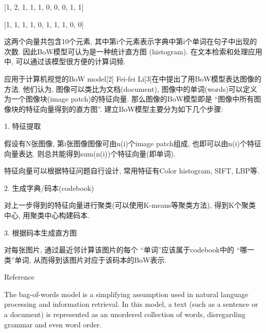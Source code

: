 \documentclass[10pt,a4paper]{ctexbook}
\begin{document}
       

         [1, 2, 1, 1, 1, 0, 0, 0, 1, 1]

           [1, 1, 1, 1, 0, 1, 1, 1, 0, 0]
            

            这两个向量共包含10个元素, 其中第i个元素表示字典中第i个单词在句子中出现的次数. 因此BoW模型可认为是一种统计直方图 (histogram). 在文本检索和处理应用中, 可以通过该模型很方便的计算词频.

            应用于计算机视觉的BoW model[2]
            Fei-fei Li[3]在中提出了用BoW模型表达图像的方法. 他们认为, 图像可以类比为文档(document), 图像中的单词(words)可以定义为一个图像块(image patch)的特征向量. 那么图像的BoW模型即是 “图像中所有图像块的特征向量得到的直方图”. 建立BoW模型主要分为如下几个步骤:

            1. 特征提取

            假设有N张图像, 第i张图像图像可由n(i)个image patch组成, 也即可以由n(i)个特征向量表达. 则总共能得到sum(n(i))个特征向量(即单词).

            特征向量可以根据特征问题自行设计, 常用特征有Color histogram, SIFT, LBP等.

            2. 生成字典/码本(codebook)

            对上一步得到的特征向量进行聚类(可以使用K-means等聚类方法), 得到K个聚类中心, 用聚类中心构建码本.

            3. 根据码本生成直方图

            对每张图片, 通过最近邻计算该图片的每个 “单词”应该属于codebook中的 “哪一类”单词, 从而得到该图片对应于该码本的BoW表示.

            Reference









The bag-of-words model is a simplifying assumption used in natural language processing and information retrieval. In this model, a text (such as a sentence or a document) is represented as an unordered collection of words, disregarding grammar and even word order.
\end{document}
